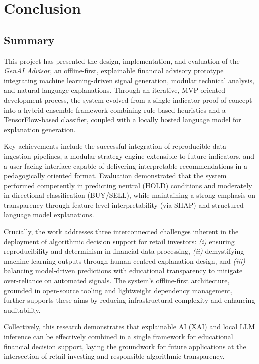 \section{Conclusion}

\subsection{Summary}

This project has presented the design, implementation, and evaluation of the \textit{GenAI Advisor}, an offline-first, explainable financial advisory prototype integrating machine learning-driven signal generation, modular technical analysis, and natural language explanations. Through an iterative, MVP-oriented development process, the system evolved from a single-indicator proof of concept into a hybrid ensemble framework combining rule-based heuristics and a TensorFlow-based classifier, coupled with a locally hosted language model for explanation generation.

Key achievements include the successful integration of reproducible data ingestion pipelines, a modular strategy engine extensible to future indicators, and a user-facing interface capable of delivering interpretable recommendations in a pedagogically oriented format. Evaluation demonstrated that the system performed competently in predicting neutral (HOLD) conditions and moderately in directional classification (BUY/SELL), while maintaining a strong emphasis on transparency through feature-level interpretability (via SHAP) and structured language model explanations.

Crucially, the work addresses three interconnected challenges inherent in the deployment of algorithmic decision support for retail investors: \textit{(i)} ensuring reproducibility and determinism in financial data processing, \textit{(ii)} demystifying machine learning outputs through human-centred explanation design, and \textit{(iii)} balancing model-driven predictions with educational transparency to mitigate over-reliance on automated signals. The system’s offline-first architecture, grounded in open-source tooling and lightweight dependency management, further supports these aims by reducing infrastructural complexity and enhancing auditability.

Collectively, this research demonstrates that explainable AI (XAI) and local LLM inference can be effectively combined in a single framework for educational financial decision support, laying the groundwork for future applications at the intersection of retail investing and responsible algorithmic transparency.

